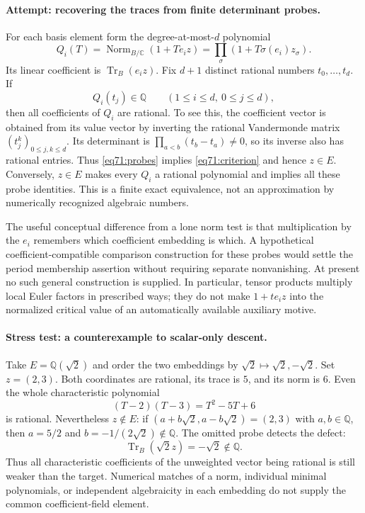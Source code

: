 \documentclass[11pt,a4paper]{article}
\numberwithin{equation}{section}
\newcommand{\Q}{\mathbb{Q}}
\newcommand{\C}{\mathbb{C}}
\begin{document}
\paragraph{Attempt: recovering the traces from finite determinant probes.}
For each basis element form the degree-at-most-$d$ polynomial
\[
 Q_i(T)=\operatorname{Norm}_{B/\C}(1+T e_i z)
       =\prod_\sigma(1+T\sigma(e_i)z_\sigma).
\]
Its linear coefficient is $\operatorname{Tr}_B(e_i z)$.
Fix $d+1$ distinct rational numbers $t_0,\ldots,t_d$. If
\begin{equation}\label{eq71:probes}
 Q_i(t_j)\in\Q\qquad(1\leq i\leq d,
                                     \ 0\leq j\leq d),
\end{equation}
then all coefficients of $Q_i$ are rational. To see this, the coefficient
vector is obtained from its value vector by inverting the rational
Vandermonde matrix $(t_j^k)_{0\leq j,k\leq d}$. Its determinant is
$\prod_{a<b}(t_b-t_a)\ne0$, so its inverse also has rational entries.
Thus \eqref{eq71:probes} implies \eqref{eq71:criterion} and hence $z\in E$.
Conversely, $z\in E$ makes every $Q_i$ a rational polynomial and implies
all these probe identities. This is a finite exact equivalence, not an
approximation by numerically recognized algebraic numbers.

The useful conceptual difference from a lone norm test is that multiplication
by the $e_i$ remembers which coefficient embedding is which. A hypothetical
coefficient-compatible comparison construction for these probes would
settle the period membership assertion without requiring separate
nonvanishing. At present no such general construction is supplied. In
particular, tensor products multiply local Euler factors in prescribed
ways; they do not make $1+t e_i z$ into the normalized critical value of
an automatically available auxiliary motive.

\paragraph{Stress test: a counterexample to scalar-only descent.}
Take $E=\Q(\sqrt2)$ and order the two embeddings by
$\sqrt2\mapsto\sqrt2,-\sqrt2$. Set $z=(2,3)$.
Both coordinates are rational, its trace is $5$, and its norm is $6$.
Even the whole characteristic polynomial
\[
 (T-2)(T-3)=T^2-5T+6
\]
is rational. Nevertheless $z\notin E$: if
$(a+b\sqrt2,a-b\sqrt2)=(2,3)$ with $a,b\in\Q$, then
$a=5/2$ and $b=-1/(2\sqrt2)\notin\Q$.
The omitted probe detects the defect:
\[
 \operatorname{Tr}_B(\sqrt2 z)=-\sqrt2\notin\Q.
\]
Thus all characteristic coefficients of the unweighted vector being
rational is still weaker than the target. Numerical matches of a norm,
individual minimal polynomials, or independent algebraicity in each
embedding do not supply the common coefficient-field element.
\end{document}

